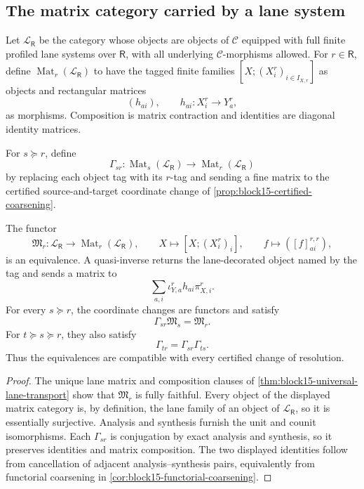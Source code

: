 \subsection{The matrix category carried by a lane system}
\label{subsec:block15-matrix-category}

\begin{definition}
\label{def:block15-lane-matrix-category}
Let \(\mathcal L_{\mathsf R}\) be the category whose objects are objects of
\(\mathcal C\) equipped with full finite profiled lane systems over
\(\mathsf R\), with all underlying \(\mathcal C\)-morphisms allowed.  For
\(r\in\mathsf R\), define
\(\operatorname{Mat}_r(\mathcal L_{\mathsf R})\) to have the tagged finite
families
\([X;(X_i^r)_{i\in I_{X,r}}]\) as objects and rectangular matrices
\[
 (h_{a i}),
 \qquad h_{a i}:X_i^r\to Y_a^r,
\]
as morphisms.  Composition is matrix contraction and identities are diagonal
identity matrices.

For \(s\succeq r\), define
\[
 \Gamma_{sr}:\operatorname{Mat}_s(\mathcal L_{\mathsf R})
 \longrightarrow\operatorname{Mat}_r(\mathcal L_{\mathsf R})
\]
by replacing each object tag with its \(r\)-tag and sending a fine matrix to
the certified source-and-target coordinate change of
\cref{prop:block15-certified-coarsening}.
\end{definition}

\begin{theorem}
\label{thm:block15-matrix-category-equivalence}
The functor
\[
 \mathfrak M_r:\mathcal L_{\mathsf R}\longrightarrow
 \operatorname{Mat}_r(\mathcal L_{\mathsf R}),
 \qquad
 X\longmapsto[X;(X_i^r)_i],
 \qquad
 f\longmapsto([f]_{a i}^{r,r}),
\]
is an equivalence.  A quasi-inverse returns the lane-decorated object named by
the tag and sends a matrix to
\[
 \sum_{a,i}\iota_{Y,a}^r h_{a i}\pi_{X,i}^r.
\]
For every \(s\succeq r\), the coordinate changes are functors and satisfy
\[
 \Gamma_{sr}\mathfrak M_s=\mathfrak M_r.
\]
For \(t\succeq s\succeq r\), they also satisfy
\[
 \Gamma_{tr}=\Gamma_{sr}\Gamma_{ts}.
\]
Thus the equivalences are compatible with every certified change of
resolution.
\end{theorem}

\begin{proof}
The unique lane matrix and composition clauses of
\cref{thm:block15-universal-lane-transport} show that \(\mathfrak M_r\) is
fully faithful.  Every object of the displayed matrix category is, by
definition, the lane family of an object of \(\mathcal L_{\mathsf R}\), so it is
essentially surjective.  Analysis and synthesis furnish the unit and counit
isomorphisms.  Each \(\Gamma_{sr}\) is conjugation by exact analysis and
synthesis, so it preserves identities and matrix composition.  The two
displayed identities follow from cancellation of adjacent analysis--synthesis
pairs, equivalently from functorial coarsening in
\cref{cor:block15-functorial-coarsening}.
\end{proof}

